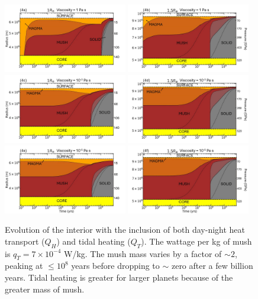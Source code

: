 \documentclass[fleqn,usenatbib]{mnras}
\begin{document}
\begin{figure}\centering
\includegraphics[width=0.48\textwidth]{4a.jpg}
\includegraphics[width=0.48\textwidth]{4b.jpg}
\includegraphics[width=0.48\textwidth]{4c.jpg}
\includegraphics[width=0.48\textwidth]{4d.jpg}
\includegraphics[width=0.48\textwidth]{4e.jpg}
\includegraphics[width=0.48\textwidth]{4f.jpg}


\caption{Evolution of the interior with the inclusion of both day-night heat transport ($Q_{H}$) and tidal heating ($Q_{T}$). The wattage per kg of mush is $q_{T} = 7 \times 10^{-4}$ W/kg. The mush mass varies by a factor of $\sim 2$, peaking at $\leq 10^{8}$ years before dropping to $\sim$ zero after a few billion years. Tidal heating is greater for larger planets because of the greater mass of mush.}
\label{fig4}
\end{figure}
\end{document}
